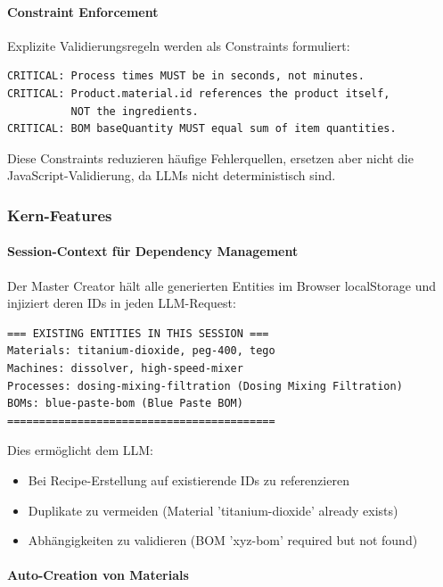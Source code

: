 \paragraph{Constraint Enforcement}

Explizite Validierungsregeln werden als Constraints formuliert:

\begin{verbatim}
CRITICAL: Process times MUST be in seconds, not minutes.
CRITICAL: Product.material.id references the product itself,
          NOT the ingredients.
CRITICAL: BOM baseQuantity MUST equal sum of item quantities.
\end{verbatim}

\noindent Diese Constraints reduzieren häufige Fehlerquellen, ersetzen aber nicht die JavaScript-Validierung, da LLMs nicht deterministisch sind.

\subsubsection{Kern-Features}

\paragraph{Session-Context für Dependency Management}

Der Master Creator hält alle generierten Entities im Browser localStorage und injiziert deren IDs in jeden LLM-Request:

\begin{verbatim}
=== EXISTING ENTITIES IN THIS SESSION ===
Materials: titanium-dioxide, peg-400, tego
Machines: dissolver, high-speed-mixer
Processes: dosing-mixing-filtration (Dosing Mixing Filtration)
BOMs: blue-paste-bom (Blue Paste BOM)
==========================================
\end{verbatim}

Dies ermöglicht dem LLM:
\begin{itemize}
    \item Bei Recipe-Erstellung auf existierende IDs zu referenzieren
    \item Duplikate zu vermeiden (\glqq Material 'titanium-dioxide' already exists\grqq{})
    \item Abhängigkeiten zu validieren (\glqq BOM 'xyz-bom' required but not found\grqq{})
\end{itemize}

\paragraph{Auto-Creation von Materials}

